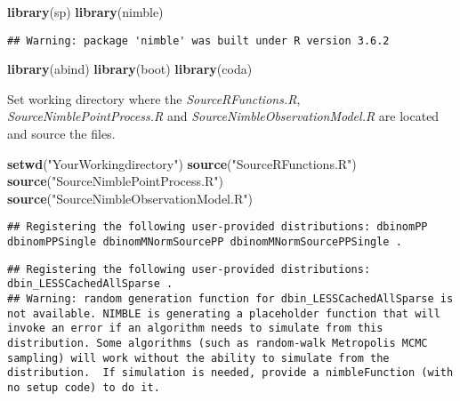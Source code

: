 \documentclass[
]{article}
\newenvironment{Shaded}{\begin{snugshade}}{\end{snugshade}}
\newcommand{\KeywordTok}[1]{\textcolor[rgb]{0.13,0.29,0.53}{\textbf{#1}}}
\newcommand{\NormalTok}[1]{#1}
\newcommand{\StringTok}[1]{\textcolor[rgb]{0.31,0.60,0.02}{#1}}
\begin{document}
\begin{Shaded}
\begin{Highlighting}[]
\KeywordTok{library}\NormalTok{(sp)}
\KeywordTok{library}\NormalTok{(nimble)}
\end{Highlighting}
\end{Shaded}

\begin{verbatim}
## Warning: package 'nimble' was built under R version 3.6.2
\end{verbatim}

\begin{Shaded}
\begin{Highlighting}[]
\KeywordTok{library}\NormalTok{(abind)}
\KeywordTok{library}\NormalTok{(boot)}
\KeywordTok{library}\NormalTok{(coda)}
\end{Highlighting}
\end{Shaded}

Set working directory where the \emph{SourceRFunctions.R},
\emph{SourceNimblePointProcess.R} and
\emph{SourceNimbleObservationModel.R} are located and source the files.

\begin{Shaded}
\begin{Highlighting}[]
\KeywordTok{setwd}\NormalTok{(}\StringTok{"YourWorkingdirectory"}\NormalTok{)}
\KeywordTok{source}\NormalTok{(}\StringTok{"SourceRFunctions.R"}\NormalTok{)}
\KeywordTok{source}\NormalTok{(}\StringTok{"SourceNimblePointProcess.R"}\NormalTok{)}
\KeywordTok{source}\NormalTok{(}\StringTok{"SourceNimbleObservationModel.R"}\NormalTok{)}
\end{Highlighting}
\end{Shaded}

\begin{verbatim}
## Registering the following user-provided distributions: dbinomPP dbinomPPSingle dbinomMNormSourcePP dbinomMNormSourcePPSingle .
\end{verbatim}

\begin{verbatim}
## Registering the following user-provided distributions: dbin_LESSCachedAllSparse .
## Warning: random generation function for dbin_LESSCachedAllSparse is not available. NIMBLE is generating a placeholder function that will invoke an error if an algorithm needs to simulate from this distribution. Some algorithms (such as random-walk Metropolis MCMC sampling) will work without the ability to simulate from the distribution.  If simulation is needed, provide a nimbleFunction (with no setup code) to do it.
\end{verbatim}
\end{document}
